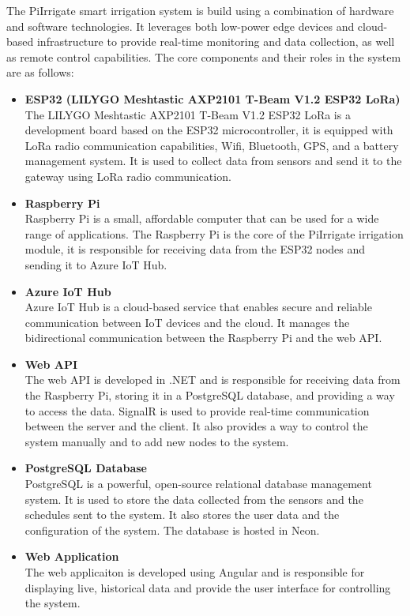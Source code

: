 The PiIrrigate smart irrigation system is build using a combination of hardware and software technologies.
It leverages both low-power edge devices and cloud-based infrastructure to provide real-time monitoring
and data collection, as well as remote control capabilities.
The core components and their roles in the system are as follows:
\begin{itemize}
  \item \textbf{ESP32 (LILYGO Meshtastic AXP2101 T-Beam V1.2 ESP32 LoRa)} \\
  The LILYGO Meshtastic AXP2101 T-Beam V1.2 ESP32 LoRa is a development board based on the ESP32 microcontroller, it is equipped with
  LoRa radio communication capabilities, Wifi, Bluetooth, GPS, and a battery management system.
  It is used to collect data from sensors and send it to the gateway using LoRa radio communication.

  \item \textbf{Raspberry Pi} \\
  Raspberry Pi is a small, affordable computer that can be used for a wide range of applications.
  The Raspberry Pi is the core of the PiIrrigate irrigation module, 
  it is responsible for receiving data from the ESP32 nodes and sending it to Azure IoT Hub.

  \item \textbf{Azure IoT Hub} \\
  Azure IoT Hub is a cloud-based service that enables secure and reliable communication 
  between IoT devices and the cloud.
  It manages the bidirectional communication between the Raspberry Pi and the web API.

  \item \textbf{Web API} \\
  The web API is developed in .NET and is responsible for receiving data from the Raspberry Pi,
  storing it in a PostgreSQL database, and providing a way to access the data.
  SignalR is used to provide real-time communication between the server and the client.
  It also provides a way to control the system manually and to add new nodes to the system.

  \item \textbf{PostgreSQL Database} \\
  PostgreSQL is a powerful, open-source relational database management system.
  It is used to store the data collected from the sensors and the schedules sent to the system. It also
  stores the user data and the configuration of the system. The database is hosted in Neon.

  \item \textbf{Web Application} \\
  The web applicaiton is developed using Angular and is responsible for displaying live, historical data
  and provide the user interface for controlling the system.
\end{itemize}

